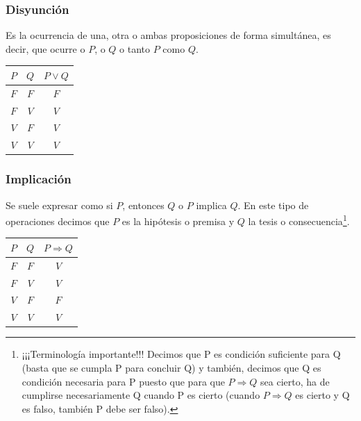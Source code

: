 \documentclass[10pt,a4paper,openright]{book}
\begin{document}
\subsubsection*{Disyunción}
Es la ocurrencia de una, otra o ambas proposiciones de forma simultánea, es decir, que ocurre o $P$, o $Q$ o tanto $P$ como $Q$.
\begin{center}
 \begin{tabular}{ |c|c|c| } 
   \hline
     $P$ & $Q$ & $P \vee Q$ \\ [0.5ex] 
   \hline \hline
     $F$ & $F$ & $F$ \\
   \hline 
     $F$ & $V$ & $V$ \\
   \hline
     $V$ & $F$ & $V$ \\
   \hline
     $V$ & $V$ & $V$ \\
   \hline
 \end{tabular}
\end{center}

\subsubsection*{Implicación}
Se suele expresar como si $P$, entonces $Q$ o $P$ implica $Q$. En este tipo de operaciones decimos que $P$ es la hipótesis o premisa y $Q$ la tesis o consecuencia\footnote{\scriptsize ¡¡¡Terminología importante!!! Decimos que P es condición suficiente para Q (basta que se cumpla P para concluir Q) y también, decimos que Q es condición necesaria para P puesto que para que $P \Rightarrow Q$ sea cierto, ha de cumplirse necesariamente Q cuando P es cierto (cuando $P \Rightarrow Q$ es cierto y Q es falso, también P debe ser falso).}. 

\begin{center}
 \begin{tabular}{ |c|c|c| } 
   \hline
     $P$ & $Q$ & $P \Rightarrow Q$ \\ [0.5ex] 
   \hline \hline
     $F$ & $F$ & $V$ \\
   \hline 
     $F$ & $V$ & $V$ \\
   \hline
     $V$ & $F$ & $F$ \\
   \hline
     $V$ & $V$ & $V$ \\
   \hline
 \end{tabular}
\end{center}
\end{document}
